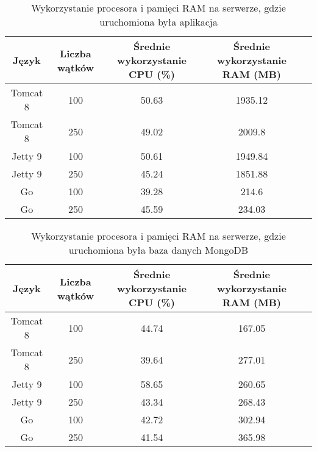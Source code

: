  \begin{table}[!htb]
 \centering
 \caption{Wykorzystanie procesora i pamięci RAM na serwerze, gdzie uruchomiona była aplikacja}
 \label{tab:app-clean-key}
 \begin{tabular}{@{}ccccl@{}}
 \toprule
 \textbf{Język} & \textbf{Liczba wątków} & \multicolumn{1}{p{3cm}}{\textbf{Średnie wykorzystanie CPU (\%)}} & \multicolumn{1}{p{3cm}}{\textbf{Średnie wykorzystanie RAM (MB)}} &  \\ \midrule
 Tomcat 8       & 100                    & 50.63                             & 1935.12                          &  \\
 Tomcat 8       & 250                    & 49.02                             & 2009.8                          &  \\
 Jetty 9       & 100                    & 50.61                             & 1949.84                          &  \\
 Jetty 9       & 250                    & 45.24                             & 1851.88                          &  \\
 Go       & 100                    & 39.28                             & 214.6                          &  \\
 Go       & 250                    & 45.59                             & 234.03                          &  \\
 \bottomrule
 \end{tabular}
 \end{table}


 \begin{table}[!htb]
 \centering
 \caption{Wykorzystanie procesora i pamięci RAM na serwerze, gdzie uruchomiona była baza danych MongoDB}
 \label{tab:mongo-clean-key}
 \begin{tabular}{@{}ccccl@{}}
 \toprule
 \textbf{Język} & \textbf{Liczba wątków} & \multicolumn{1}{p{3cm}}{\textbf{Średnie wykorzystanie CPU (\%)}} & \multicolumn{1}{p{3cm}}{\textbf{Średnie wykorzystanie RAM (MB)}} &  \\ \midrule
 Tomcat 8       & 100                    & 44.74                             & 167.05                          &  \\
 Tomcat 8       & 250                    & 39.64                             & 277.01                          &  \\
 Jetty 9       & 100                    & 58.65                             & 260.65                          &  \\
 Jetty 9       & 250                    & 43.34                             & 268.43                          &  \\
 Go       & 100                    & 42.72                             & 302.94                          &  \\
 Go       & 250                    & 41.54                             & 365.98                          &  \\
 \bottomrule
 \end{tabular}
 \end{table}


